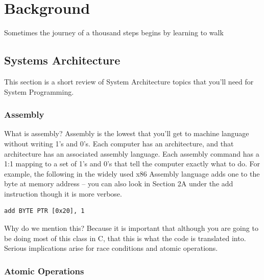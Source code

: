 \chapter{Background}

\epigraph{Sometimes the journey of a thousand steps begins by learning to walk}{}

\section{Systems Architecture}

This section is a short review of System Architecture topics that you'll need for System Programming.

\subsection{Assembly}

What is assembly? Assembly is the lowest that you'll get to machine language without writing 1's and 0's.
Each computer has an architecture, and that architecture has an associated assembly language.
Each assembly command has a 1:1 mapping to a set of 1's and 0's that tell the computer exactly what to do.
For example, the following in the widely used x86 Assembly language adds one to the byte at memory address  \cite{wiki:xxx} -- you can also look in \cite{guide2011intel} Section 2A under the add instruction though it is more verbose.

\begin{lstlisting}[language={[x86masm]Assembler}]
add BYTE PTR [0x20], 1
\end{lstlisting}

Why do we mention this? Because it is important that although you are going to be doing most of this class in C, that this is what the code is translated into.
Serious implications arise for race conditions and atomic operations.

\subsection{Atomic Operations}

